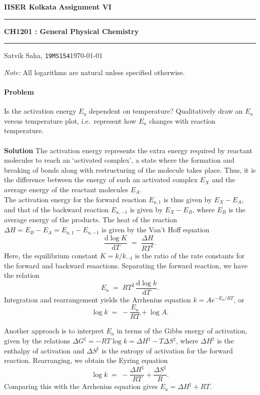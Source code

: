 \documentclass[10pt]{article}
\newcounter{prob}
\def\problem{\stepcounter{prob}\paragraph{Problem \arabic{prob}}}
\def\solution{\\\\\textbf{Solution }}
\begin{document}
        \par\textbf{IISER Kolkata} \hfill \textbf{Assignment VI}
        \vspace{3pt}
        \hrule
        \vspace{3pt}
        \begin{center}
                \LARGE{\textbf{CH1201 : General Physical Chemistry}}
        \end{center}
        \vspace{3pt}
        \hrule
        \vspace{3pt}
        Satvik Saha, \texttt{19MS154}\hfill\today
        \vspace{20pt}

        \textit{Note:} All logarithms are natural unless specified otherwise.

        \problem Is the activation energy $E_a$ dependent on temperature? Qualitatively draw an $E_a$ versus temperature plot, i.e.\ 
        represent how $E_a$ changes with reaction temperature.
        \solution The activation energy represents the extra energy required by reactant molecules to reach an `activated complex',
        a state where the formation and breaking of bonds along with restructuring of the molecule takes place. Thus, it is the 
        difference between the energy of such an activated complex $E_X$ and the average energy of the reactant molecules $E_A$. \\
        
        The activation energy for the forward reaction $E_{a,1}$ is thus given by $E_X - E_A$, and that of the backward reaction
        $E_{a,-1}$ is given by $E_X - E_B$, where $E_B$ is the average energy of the products. The heat of 
        the reaction $\Delta H = E_B - E_A = E_{a,1} - E_{a,-1}$ is given by the Van't Hoff equation
        \[
        \frac{\mathrm{d}\log{K}}{\mathrm{d}{T}} \;=\; \frac{\Delta{H}}{RT^2}.
        \]
        Here, the equilibrium constant $K = k /k_{-1}$ is the ratio of the rate constants for the forward and backward reaactions.
        Separating the forward reaction, we have the relation
        \[
        E_a \;=\; RT^2\, \frac{\mathrm{d}\log{k}}{\mathrm{d}{T}}.
        \]
        Integration and rearrangement yields the Arrhenius equation $k = Ae^{-E_a / RT}$, or
        \[
        \log{k} \;=\; -\frac{E_a}{RT} + \log{A}.
        \]

        Another approach is to interpret $E_a$ in terms of the Gibbs energy of activation, given by the relations
        $\Delta G^\ddagger = -RT\log{k} = \Delta H^\ddagger - T\Delta S^\ddagger$, where $\Delta H^\ddagger$ is the enthalpy of activation
        and $\Delta S^\ddagger$ is the entropy of activation for the forward reaction. Rearranging, we obtain the Eyring equation
        \[
        \log{k} \;=\; -\frac{\Delta H^\ddagger}{RT} + \frac{\Delta S^\ddagger}{R}.
        \]
        Comparing this with the Arrhenius equation gives $E_a = \Delta H^\ddagger + RT$. \\
\end{document}
